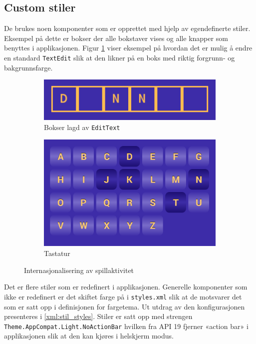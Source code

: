 \subsection{Custom stiler}
De brukes noen komponenter som er opprettet med hjelp av egendefinerte stiler. Eksempel på dette er bokser der alle bokstaver vises og alle knapper som benyttes i applikasjonen. Figur \ref{fig:gui_bokser} viser eksempel på hvordan det er mulig å endre en standard \texttt{TextEdit} slik at den likner på en boks med riktig forgrunn- og bakgrunnsfarge.

\begin{figure}[ht]
    \centering
   \begin{subfigure}[b]{0.3\textwidth}
        \includegraphics[width=\textwidth]{./img/gui/2.png}
        \caption{Bokser lagd av \texttt{EditText}}
        \label{fig:gui_bokser}
    \end{subfigure}
    \begin{subfigure}[b]{0.3\textwidth}
        \includegraphics[width=\textwidth]{./img/gui/3.png}
        \caption{Tastatur}
        \label{fig:gui_tastatur_eng}
    \end{subfigure}
    \caption{Internasjonalisering av spillaktivitet}
    \label{fig:custom_gui_comp}
\end{figure}

Det er flere stiler som er redefinert i applikasjonen. Generelle komponenter som ikke er redefinert er det skiftet farge på i \texttt{styles.xml} slik at de motsvarer det som er satt opp i definisjonen for fargetema. Ut utdrag av den konfigurasjonen presenteres i \ref{xml:stil_styles}. Stiler er satt opp med strengen \texttt{Theme.AppCompat.Light.NoActionBar} hvilken fra API 19 fjerner «action bar» i applikasjonen slik at den kan kjøres i helskjerm modus. 

